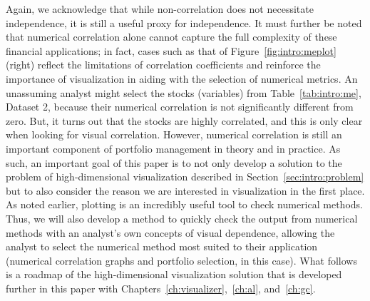 Again, we acknowledge that while non-correlation 
does not necessitate independence, it is still a useful proxy for independence.
It must further be noted that numerical correlation alone cannot capture the 
full complexity of these financial applications; in fact, cases such as that of 
Figure~\ref{fig:intro:meplot} (right) reflect the limitations of correlation 
coefficients and reinforce the importance of visualization in aiding with the 
selection of numerical metrics. An unassuming 
analyst might select the stocks (variables) from Table~\ref{tab:intro:me}, 
Dataset 2, because their numerical correlation is not significantly different 
from zero. But, it turns out that the stocks are highly correlated, and this is 
only clear when looking for visual correlation. However, numerical correlation 
is still an important component of portfolio management in theory and in 
practice. 
As such, an important goal of this paper is to not only develop a 
solution to the problem of high-dimensional visualization described in 
Section~\ref{sec:intro:problem} but to also consider the reason we are 
interested in visualization in the first place. As noted earlier, plotting is 
an incredibly useful tool to check numerical methods. Thus, we will also 
develop a method to quickly check the output from numerical methods with an 
analyst's own concepts of visual dependence, allowing the analyst to select the 
numerical method most suited to their application (numerical correlation graphs 
and portfolio selection, in this case). 
What follows is a roadmap of the high-dimensional visualization solution that 
is developed further in this paper with 
Chapters~\ref{ch:visualizer},~\ref{ch:al}, and~\ref{ch:gc}.